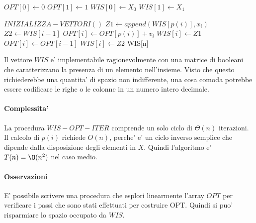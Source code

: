 \begin{algorithm}
    \begin{algorithmic}
            \State $OPT[0] \gets 0$
            \State $OPT[1] \gets 1$
            \State $WIS[0] \gets X_0$
            \State $WIS[1] \gets X_1$
        \EndProcedure
    \end{algorithmic}
\end{algorithm}

\begin{algorithm}
    \begin{algorithmic}
            \State $INIZIALIZZA-VETTORI()$
                \State $Z1 \gets append(WIS[p(i)], x_i)$
                \State $Z2 \gets WIS[i-1]$
                    \State $OPT[i] \gets OPT[p(i)] + v_i$
                    \State $WIS[i] \gets Z1$
                \Else
                    \State $OPT[i] \gets OPT[i-1]$
                    \State $WIS[i] \gets Z2$
                \EndIf
            \EndFor
            \State \Return WIS[n]
        \EndProcedure
    \end{algorithmic}
\end{algorithm}

Il vettore $WIS$ e' implementabile ragionevolmente con una matrice di booleani che caratterizzano la presenza di un elemento nell'insieme. Visto che questo richiederebbe una quantita' di spazio non indifferente, una cosa comoda potrebbe essere codificare le righe o le colonne in un numero intero decimale.

\paragraph{Complessita'}

La procedura $WIS-OPT-ITER$ comprende un solo ciclo di $\Theta(n)$ iterazioni.
Il calcolo di $p(i)$ richiede $O(n)$, perche' e' un ciclo inverso semplice che dipende dalla disposizione degli elementi in $X$.
Quindi l'algoritmo e' $T(n) = \O(n^2)$ nel caso medio.

\paragraph{Osservazioni}

E' possibile scrivere una procedura che esplori linearmente l'array $OPT$ per verificare i passi che sono stati effettuati per costruire OPT. Quindi si puo' risparmiare lo spazio occupato da $WIS$.

